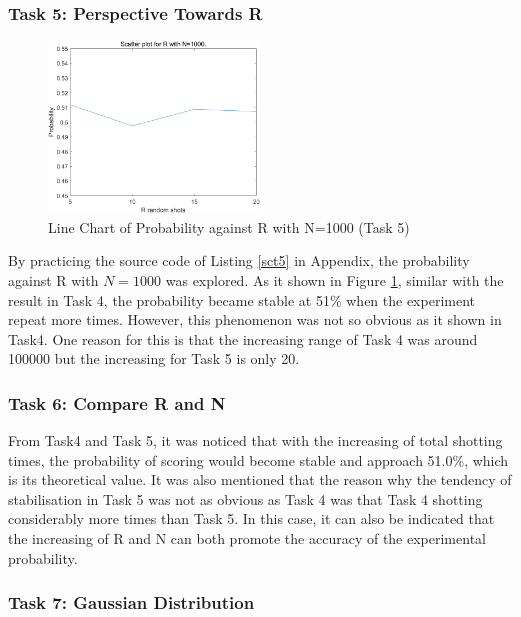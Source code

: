 \documentclass[11pt, a4paper]{article}
\begin{document}
\subsubsection{Task 5: Perspective Towards R}

\begin{figure}[htbp]     \begin{centering}
    \includegraphics[width=0.5\textwidth]{img/t5.png}
    \caption{Line Chart of Probability against R with N=1000 (Task 5)}
    \label{Fig:task5}
    \end{centering}
\end{figure}

By practicing the source code of Listing \ref{sct5} in Appendix, the probability against R with $N=1000$ was explored. As it shown in Figure \ref{Fig:task5}, similar with the result in Task 4, the probability became stable at 51\% when the experiment repeat more times. However, this phenomenon was not so obvious as it shown in Task4. One reason for this is that the increasing range of Task 4 was around 100000 but the increasing for Task 5 is only 20.

\subsubsection{Task 6: Compare R and N}

From Task4 and Task 5, it was noticed that with the increasing of total shotting times, the probability of scoring would become stable and approach 51.0\%, which is its theoretical value. It was also mentioned that the reason why the tendency of stabilisation in Task 5 was not as obvious as Task 4 was that Task 4 shotting considerably more times than Task 5. In this case, it can also be indicated that the increasing of R and N can both promote the accuracy of the experimental probability.

\subsubsection{Task 7: Gaussian Distribution}
\end{document}
